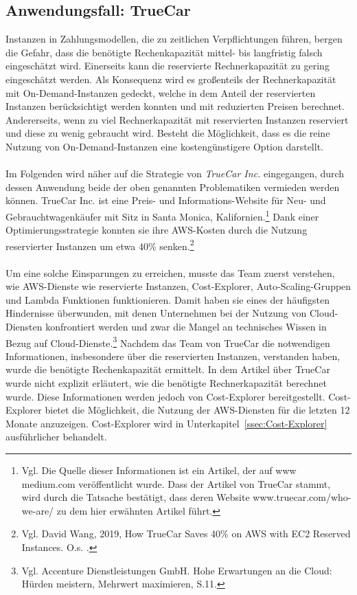 \subsection{Anwendungsfall: TrueCar}\label{ssec:UseCaseTrueCar}
Instanzen in Zahlungsmodellen, die zu zeitlichen Verpflichtungen führen, bergen die Gefahr, dass die benötigte Rechenkapazität mittel- bis langfristig falsch eingeschätzt wird. Einerseits kann die reservierte Rechnerkapazität zu gering eingeschätzt werden. Als Konsequenz wird es großenteils der Rechnerkapazität mit On-Demand-Instanzen gedeckt, welche in dem Anteil der reservierten Instanzen berücksichtigt werden konnten und mit reduzierten Preisen berechnet. Andererseits, wenn zu viel Rechnerkapazität mit reservierten Instanzen reserviert und diese zu wenig gebraucht wird. Besteht die Möglichkeit, dass es die reine Nutzung von On-Demand-Instanzen eine kostengünstigere Option darstellt.
\\\\
Im Folgenden wird näher auf die Strategie von \textit{TrueCar Inc.} eingegangen, durch dessen Anwendung beide der oben genannten Problematiken vermieden werden können.  
TrueCar Inc. ist eine Preis- und Informations-Website für Neu- und Gebrauchtwagenkäufer mit Sitz in Santa Monica, Kalifornien.\footnote{Vgl. Die Quelle dieser Informationen ist ein Artikel\cite{MED1}, der auf www medium.com veröffentlicht wurde. Dass der Artikel von TrueCar stammt, wird durch die Tatsache bestätigt, dass deren Website www.truecar.com/who-we-are/ zu dem hier erwähnten Artikel führt.}
Dank einer Optimierungsstrategie konnten sie ihre AWS-Kosten durch die Nutzung reservierter Instanzen um etwa 40\% senken.\footnote{Vgl. David Wang, 2019, How TrueCar Saves 40\% on AWS with EC2 Reserved Instances. O.s. \cite{MED1}.}
\\\\
Um eine solche Einsparungen zu erreichen, musste das Team zuerst verstehen, wie AWS-Dienste wie reservierte Instanzen, Cost-Explorer, Auto-Scaling-Gruppen und Lambda Funktionen funktionieren. Damit haben sie eines der häufigsten Hindernisse überwunden, mit denen Unternehmen bei der Nutzung von Cloud-Diensten konfrontiert werden und zwar die Mangel an technisches Wissen in Bezug auf Cloud-Dienste.\footnote{Vgl. Accenture Dienstleistungen GmbH. Hohe Erwartungen an die Cloud: Hürden meistern, Mehrwert maximieren, S.11\cite{ACC1}.} Nachdem das Team von TrueCar die notwendigen Informationen, insbesondere über die reservierten Instanzen, verstanden haben, wurde die benötigte Rechenkapazität ermittelt. In dem Artikel über TrueCar wurde nicht explizit erläutert, wie die benötigte Rechnerkapazität berechnet wurde. Diese Informationen werden jedoch von Cost-Explorer bereitgestellt. Cost-Explorer bietet die Möglichkeit, die Nutzung der AWS-Diensten für die letzten 12 Monate anzuzeigen. Cost-Explorer wird in Unterkapitel~\ref{ssec:Cost-Explorer} ausführlicher behandelt.
